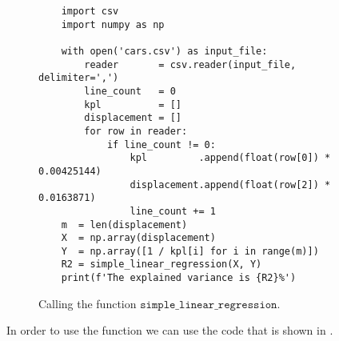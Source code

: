 \begin{figure}[!ht]
\centering
\begin{verbatim}
    import csv
    import numpy as np
    
    with open('cars.csv') as input_file:
        reader       = csv.reader(input_file, delimiter=',')
        line_count   = 0
        kpl          = []
        displacement = []
        for row in reader:
            if line_count != 0:
                kpl         .append(float(row[0]) * 0.00425144) 
                displacement.append(float(row[2]) * 0.0163871)
                line_count += 1
    m  = len(displacement)
    X  = np.array(displacement)
    Y  = np.array([1 / kpl[i] for i in range(m)])
    R2 = simple_linear_regression(X, Y)
    print(f'The explained variance is {R2}%')
\end{verbatim}
\vspace*{-0.3cm}
\caption{Calling the function $\mathtt{simple\_linear\_regression}$.}
\label{fig:simple_linear_regression.py:test}
\end{figure}
In order to use the function we can use the code that is shown in 
.
